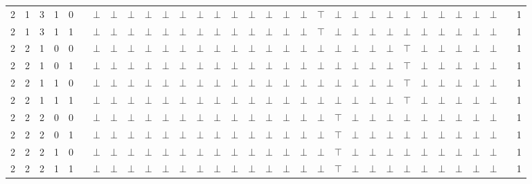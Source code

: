 \documentclass[12pt]{extarticle}
\begin{document}
\begin{landscape}
\begin{tiny}
\begin{longtable}[c]{llllllllllllllllllllllllllllllll}
2 & 1 & 3 & 1 & 0 &  & $\bot$ & $\bot$ & $\bot$ & $\bot$ & $\bot$ & $\bot$ & $\bot$ & $\bot$ & $\bot$ & $\bot$ & $\bot$ & $\bot$ & $\bot$ & $\top$ & $\bot$ & $\bot$ & $\bot$ & $\bot$ & $\bot$ & $\bot$ & $\bot$ & $\bot$ & $\bot$ & $\bot$ &  & 1 \\
2 & 1 & 3 & 1 & 1 &  & $\bot$ & $\bot$ & $\bot$ & $\bot$ & $\bot$ & $\bot$ & $\bot$ & $\bot$ & $\bot$ & $\bot$ & $\bot$ & $\bot$ & $\bot$ & $\top$ & $\bot$ & $\bot$ & $\bot$ & $\bot$ & $\bot$ & $\bot$ & $\bot$ & $\bot$ & $\bot$ & $\bot$ &  & 1 \\
2 & 2 & 1 & 0 & 0 &  & $\bot$ & $\bot$ & $\bot$ & $\bot$ & $\bot$ & $\bot$ & $\bot$ & $\bot$ & $\bot$ & $\bot$ & $\bot$ & $\bot$ & $\bot$ & $\bot$ & $\bot$ & $\bot$ & $\bot$ & $\bot$ & $\top$ & $\bot$ & $\bot$ & $\bot$ & $\bot$ & $\bot$ &  & 1 \\
2 & 2 & 1 & 0 & 1 &  & $\bot$ & $\bot$ & $\bot$ & $\bot$ & $\bot$ & $\bot$ & $\bot$ & $\bot$ & $\bot$ & $\bot$ & $\bot$ & $\bot$ & $\bot$ & $\bot$ & $\bot$ & $\bot$ & $\bot$ & $\bot$ & $\top$ & $\bot$ & $\bot$ & $\bot$ & $\bot$ & $\bot$ &  & 1 \\
2 & 2 & 1 & 1 & 0 &  & $\bot$ & $\bot$ & $\bot$ & $\bot$ & $\bot$ & $\bot$ & $\bot$ & $\bot$ & $\bot$ & $\bot$ & $\bot$ & $\bot$ & $\bot$ & $\bot$ & $\bot$ & $\bot$ & $\bot$ & $\bot$ & $\top$ & $\bot$ & $\bot$ & $\bot$ & $\bot$ & $\bot$ &  & 1 \\
2 & 2 & 1 & 1 & 1 &  & $\bot$ & $\bot$ & $\bot$ & $\bot$ & $\bot$ & $\bot$ & $\bot$ & $\bot$ & $\bot$ & $\bot$ & $\bot$ & $\bot$ & $\bot$ & $\bot$ & $\bot$ & $\bot$ & $\bot$ & $\bot$ & $\top$ & $\bot$ & $\bot$ & $\bot$ & $\bot$ & $\bot$ &  & 1 \\
2 & 2 & 2 & 0 & 0 &  & $\bot$ & $\bot$ & $\bot$ & $\bot$ & $\bot$ & $\bot$ & $\bot$ & $\bot$ & $\bot$ & $\bot$ & $\bot$ & $\bot$ & $\bot$ & $\bot$ & $\top$ & $\bot$ & $\bot$ & $\bot$ & $\bot$ & $\bot$ & $\bot$ & $\bot$ & $\bot$ & $\bot$ &  & 1 \\
2 & 2 & 2 & 0 & 1 &  & $\bot$ & $\bot$ & $\bot$ & $\bot$ & $\bot$ & $\bot$ & $\bot$ & $\bot$ & $\bot$ & $\bot$ & $\bot$ & $\bot$ & $\bot$ & $\bot$ & $\top$ & $\bot$ & $\bot$ & $\bot$ & $\bot$ & $\bot$ & $\bot$ & $\bot$ & $\bot$ & $\bot$ &  & 1 \\
2 & 2 & 2 & 1 & 0 &  & $\bot$ & $\bot$ & $\bot$ & $\bot$ & $\bot$ & $\bot$ & $\bot$ & $\bot$ & $\bot$ & $\bot$ & $\bot$ & $\bot$ & $\bot$ & $\bot$ & $\top$ & $\bot$ & $\bot$ & $\bot$ & $\bot$ & $\bot$ & $\bot$ & $\bot$ & $\bot$ & $\bot$ &  & 1 \\
2 & 2 & 2 & 1 & 1 &  & $\bot$ & $\bot$ & $\bot$ & $\bot$ & $\bot$ & $\bot$ & $\bot$ & $\bot$ & $\bot$ & $\bot$ & $\bot$ & $\bot$ & $\bot$ & $\bot$ & $\top$ & $\bot$ & $\bot$ & $\bot$ & $\bot$ & $\bot$ & $\bot$ & $\bot$ & $\bot$ & $\bot$ &  & 1 \\

\end{longtable}
\end{tiny}
\end{landscape}
\end{document}

